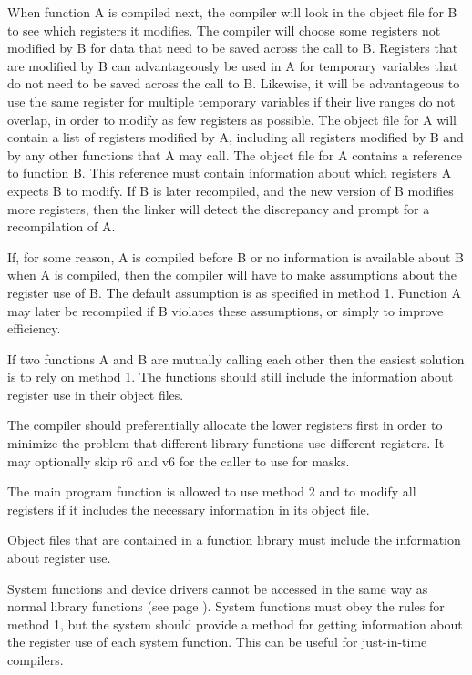\documentclass[forwardcom.tex]{subfiles}
\begin{document}
When function A is compiled next, the compiler will look in the object file for B to see which registers it modifies. The compiler will choose some registers not modified by B for data that need to be saved across the call to B. Registers that are modified by B can advantageously be used in A for temporary variables that do not need to be saved across the call to B. Likewise, it will be advantageous to use the same register for multiple temporary variables if their live ranges do not overlap, in order to modify as few registers as possible. The object file for A will contain a list of registers modified by A, including all registers modified by B and by any other functions that A may call. The object file for A contains a reference to function B. This reference must contain information about which registers A expects B to modify. If B is later recompiled, and the new version of B modifies more registers, then the linker will detect the discrepancy and prompt for a recompilation of A.
\vspace{2mm}

If, for some reason, A is compiled before B or no information is available about B when A is compiled, then the compiler will have to make assumptions about the register use of B. The default assumption is as specified in method 1. Function A may later be recompiled if B violates these assumptions, or simply to improve efficiency. 
\vspace{2mm}

If two functions A and B are mutually calling each other then the easiest solution is to rely on method 1. The functions should still include the information about register use in their object files. 
\vspace{2mm}

The compiler should preferentially allocate the lower registers first in order to minimize the problem that different library functions use different registers. It may optionally skip r6 and v6 for the caller to use for masks. 
\vspace{2mm}

The main program function is allowed to use method 2 and to modify all registers if it includes the necessary information in its object file. 
\vspace{2mm}

Object files that are contained in a function library must include the information about register use. 
\vspace{2mm}

System functions and device drivers cannot be accessed in the same way as normal library functions (see page \pageref{systemCallIDSystem}). System functions must obey the rules for method 1, but the system should provide a method for getting information about the register use of each system function. This can be useful for just-in-time compilers. 
\end{document}
